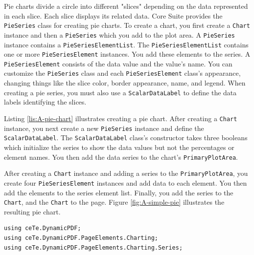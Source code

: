 \documentclass[american]{tufte-book}
\numberwithin{equation}{section}
\numberwithin{figure}{section}
\begin{document}
{Pie charts divide a circle into different "slices" depending on
the data represented in each slice. Each slice displays its related
data. Core Suite provides the \texttt{PieSeries} class for creating
pie charts. To create a chart, you first create a \texttt{Chart} instance
and then a \texttt{PieSeries} which you add to the plot area. A \texttt{PieSeries}
instance contains a \texttt{PieSeriesElementList}. The \texttt{PieSeriesElementList}
contains one or more \texttt{PieSeriesElement} instances. You add
these elements to the series. A \texttt{PieSeriesElement} consists
of the data value and the value's name. You can customize the \texttt{PieSeries}
class and each \texttt{PieSeriesElement} class's appearance, changing
things like the slice color, border appearance, name, and legend.
When creating a pie series, you must also use a \texttt{ScalarDataLabel}
to define the data labels identifying the slices. 

Listing \ref{lis:A-pie-chart} illustrates creating a pie chart. After
creating a \texttt{Chart} instance, you next create a new \texttt{PieSeries}
instance and define the \texttt{ScalarDataLabel}. The \texttt{ScalarDataLabel}
class's constructor takes three booleans which initialize the series
to show the data values but not the percentages or element names.
You then add the data series to the chart's \texttt{PrimaryPlotArea}. 

After creating a \texttt{Chart} instance and adding a series to the
\texttt{PrimaryPlotArea}, you create four \texttt{PieSeriesElement}
instances and add data to each element. You then add the elements to
the series element list. Finally, you add the series to the \texttt{Chart},
and the \texttt{Chart} to the page. Figure \ref{fig:A-simple-pie}
illustrates the resulting pie chart.

\bgroup{}
\begin{lstlisting}[caption={A pie chart example.},label={lis:A-pie-chart},basicstyle={\footnotesize\ttfamily},breaklines=true]
using ceTe.DynamicPDF;
using ceTe.DynamicPDF.PageElements.Charting;
using ceTe.DynamicPDF.PageElements.Charting.Series;


\end{lstlisting}}
\end{document}
